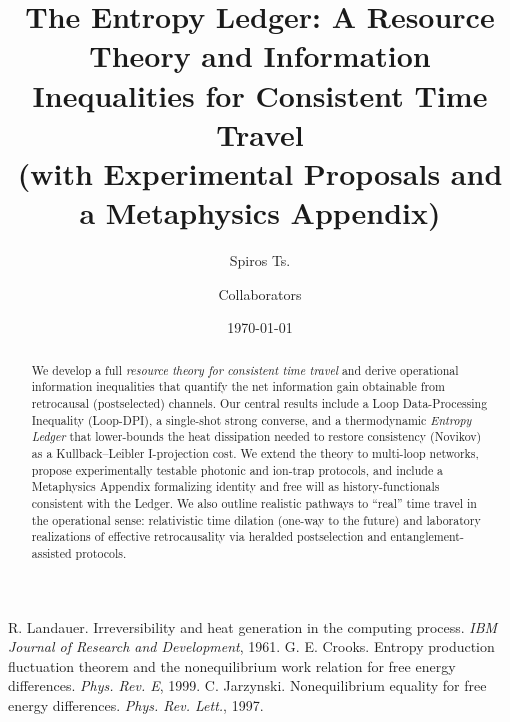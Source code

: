 \documentclass[11pt]{article}
\title{The Entropy Ledger: A Resource Theory and Information Inequalities for Consistent Time Travel\\
\large (with Experimental Proposals and a Metaphysics Appendix)}
\author{Spiros Ts. \and Collaborators}
\date{\today}
\begin{document}
\maketitle

\begin{abstract}
We develop a full \emph{resource theory for consistent time travel} and derive operational information inequalities that quantify the net information gain obtainable from retrocausal (postselected) channels. Our central results include a Loop Data-Processing Inequality (Loop-DPI), a single-shot strong converse, and a thermodynamic \emph{Entropy Ledger} that lower-bounds the heat dissipation needed to restore consistency (Novikov) as a Kullback--Leibler I-projection cost. We extend the theory to multi-loop networks, propose experimentally testable photonic and ion-trap protocols, and include a Metaphysics Appendix formalizing identity and free will as history-functionals consistent with the Ledger. We also outline realistic pathways to ``real'' time travel in the operational sense: relativistic time dilation (one-way to the future) and laboratory realizations of effective retrocausality via heralded postselection and entanglement-assisted protocols.
\end{abstract}









\appendix









 R. Landauer. Irreversibility and heat generation in the computing process. \emph{IBM Journal of Research and Development}, 1961.
 G. E. Crooks. Entropy production fluctuation theorem and the nonequilibrium work relation for free energy differences. \emph{Phys. Rev. E}, 1999.
 C. Jarzynski. Nonequilibrium equality for free energy differences. \emph{Phys. Rev. Lett.}, 1997.
\end{document}
